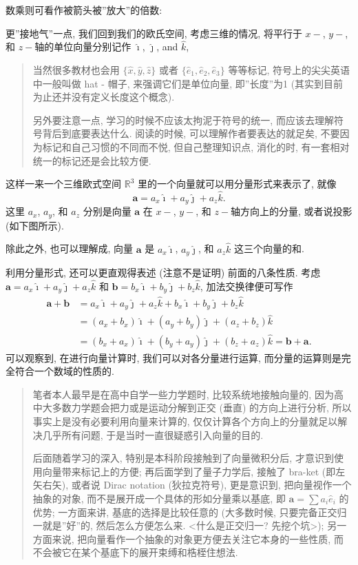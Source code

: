 数乘则可看作被箭头被''放大''的倍数:

更''接地气''一点, 我们回到我们的欧氏空间, 考虑三维的情况, 将平行于
\(x-\), \(y-\), 和 \(z-\)轴的单位向量分别记作 \(\hat{\imath}\),
\(\hat{\jmath}\), and \(\hat{k}\),

\begin{quote}
当然很多教材也会用 \(\{\hat{x},\hat{y},\hat{z}\}\) 或者
\(\{\hat{e}_1,\hat{e}_2,\hat{e}_3\}\) 等等标记,
符号上的尖尖英语中一般叫做 hat - 帽子, 来强调它们是单位向量,
即''长度''为1 (其实到目前为止还并没有定义长度这个概念).

另外要注意一点, 学习的时候不应该太拘泥于符号的统一,
而应该去理解符号背后到底要表达什么. 阅读的时候,
可以理解作者要表达的就足矣, 不要因为标记和自己习惯的不同而不悦,
但自己整理知识点, 消化的时, 有一套相对统一的标记还是会比较方便.
\end{quote}

这样一来一个三维欧式空间 \(\mathbb{R}^3\)
里的一个向量就可以用分量形式来表示了, 就像 \[
\boldsymbol{a}=a_x\hat{\imath}+a_y\hat{\jmath}+a_z\hat{k}.
\] 这里 \(a_x\), \(a_y\), 和 \(a_z\) 分别是向量 \(\boldsymbol{a}\) 在
\(x-\), \(y-\), 和 \(z-\)轴方向上的分量, 或者说投影 (如下图所示).

除此之外, 也可以理解成, 向量 \(\boldsymbol{a}\) 是 \(a_x\hat{\imath}\),
\(a_y\hat{\jmath}\), 和 \(a_z\hat{k}\) 这三个向量的和.

利用分量形式, 还可以更直观得表述 (注意不是证明) 前面的八条性质. 考虑
\(\boldsymbol{a}=a_x\hat{\imath}+a_y\hat{\jmath}+a_z\hat{k}\) 和
\(\boldsymbol{b}=b_x\hat{\imath}+b_y\hat{\jmath}+b_z\hat{k}\),
加法交换律便可写作 \[
\begin{aligned}
\boldsymbol{a}+\boldsymbol{b}&=a_x\hat{\imath}+a_y\hat{\jmath}+a_z\hat{k}+b_x\hat{\imath}+b_y\hat{\jmath}+b_z\hat{k}\\
&=(a_x+b_x)\hat{\imath}+(a_y+b_y)\hat{\jmath}+(a_z+b_z)\hat{k}\\
&=(b_x+a_x)\hat{\imath}+(b_y+a_y)\hat{\jmath}+(b_z+a_z)\hat{k}=\boldsymbol{b}+\boldsymbol{a}.
\end{aligned}
\] 可以观察到, 在进行向量计算时, 我们可以对各分量进行运算,
而分量的运算则是完全符合一个数域的性质的.

\begin{quote}
笔者本人最早是在高中自学一些力学题时, 比较系统地接触向量的,
因为高中大多数力学题会把力或是运动分解到正交 (垂直) 的方向上进行分析,
所以事实上是没有必要利用向量来计算的,
仅仅计算各个方向上的分量就足以解决几乎所有问题,
于是当时一直很疑惑引入向量的目的.

后面随着学习的深入, 特别是本科阶段接触到了向量微积分后,
才意识到使用向量带来标记上的方便; 再后面学到了量子力学后, 接触了 bra-ket
(即左矢右矢), 或者说 Dirac notation (狄拉克符号), 更是意识到,
把向量视作一个抽象的对象, 而不是展开成一个具体的形如分量乘以基底, 即
\(\boldsymbol{a}=\sum a_i\hat{e}_i\) 的优势; 一方面来讲,
基底的选择是比较任意的 (大多数时候, 只要完备正交归一就是''好''的,
然后怎么方便怎么来. \textless 什么是正交归一? 先挖个坑\textgreater);
另一方面来说, 把向量看作一个抽象的对象更方便去关注它本身的一些性质,
而不会被它在某个基底下的展开束缚和梏桎住想法.
\end{quote}
